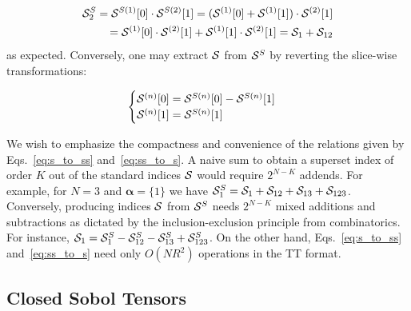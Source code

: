 \documentclass[review, twocolumn]{svjour3}          %
\begin{document}
\begin{equation}
\begin{split}
\mathcal{S}^S_{2} = \mathcal{S}^{S (1)}[0] \cdot \mathcal{S}^{S (2)}[1] = (\mathcal{S}^{(1)}[0] + \mathcal{S}^{(1)}[1]) \cdot \mathcal{S}^{(2)}[1] \\ = \mathcal{S}^{(1)}[0] \cdot \mathcal{S}^{(2)}[1] + \mathcal{S}^{(1)}[1] \cdot \mathcal{S}^{(2)}[1] = \mathcal{S}_1 + \mathcal{S}_{12}
\end{split}
\end{equation}
%
as expected. Conversely, one may extract $\mathcal{S}$ from $\mathcal{S}^S$ by reverting the slice-wise transformations:

\begin{equation}
\label{eq:ss_to_s}
\begin{cases}
\mathcal{S}^{(n)}[0] = \mathcal{S}^{S (n)}[0] - \mathcal{S}^{S (n)}[1] \\
\mathcal{S}^{(n)}[1] = \mathcal{S}^{S (n)}[1]
\end{cases}
\end{equation}

We wish to emphasize the compactness and convenience of the relations given by Eqs.~\ref{eq:s_to_ss} and~\ref{eq:ss_to_s}. A naive sum to obtain a superset index of order $K$ out of the standard indices $\mathcal{S}$ would require $2^{N-K}$ addends. For example, for $N = 3$ and $\pmb{\alpha} = \{1\}$ we have $\mathcal{S}^S_1 = \mathcal{S}_1 + \mathcal{S}_{12} + \mathcal{S}_{13} + \mathcal{S}_{123}$. Conversely, producing indices $\mathcal{S}$ from $\mathcal{S}^S$ needs $2^{N-K}$ mixed additions and subtractions as dictated by the inclusion-exclusion principle from combinatorics. For instance, $\mathcal{S}_1 = \mathcal{S}^S_1 - \mathcal{S}^S_{12} - \mathcal{S}^S_{13} + \mathcal{S}^S_{123}$. On the other hand, Eqs.~\ref{eq:s_to_ss} and~\ref{eq:ss_to_s} need only $O(N R^2)$ operations in the TT format.

\subsection{Closed Sobol Tensors} \label{sec:inclusive_sobol_tensor}

\end{document}

